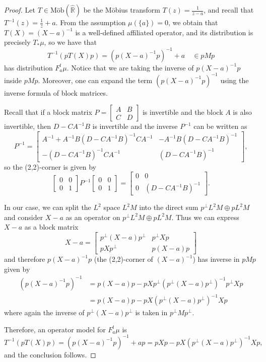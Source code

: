 \documentclass[reqno,11pt]{amsart}
\theoremstyle{remark}
\newcommand{\rr}{\mathbb{R}}
\newcommand{\pfreepower}[2]{F_{#1}^{#2}}
\newcommand{\mobr}{\text{Möb}(\hat{\rr})}
\begin{document}
\begin{proof}
Let $T\in \mobr$ be the Möbius transform $T(z)=\frac{1}{z-a}$, and recall that $T^{-1}(z)=\frac{1}{z}+a$. From the assumption $\mu(\{a\})=0$, we obtain that $T(X)=(X-a)^{-1} $ is a well-defined affiliated operator, and its distribution is precisely $T_*\mu$, so we have that
$$ T^{{-1}}( pT(X)p ) = \left( p(X-a)^{-1}p  \right)^{-1}+a \quad  \in pMp$$ 
has distribution $ \pfreepower{a}{t}\mu $. Notice that we are taking the inverse of $p(X-a)^{-1}p$ inside $ pMp$. Moreover, one can expand the term $ \left( p(X-a)^{-1}p  \right)^{-1} $ using the inverse formula of block matrices.
    
    Recall that if a block matrix $P = \begin{bmatrix}
        A&B\\
        C&D
    \end{bmatrix} $ is invertible and the block $ A $ is also invertible, then $D-CA^{-1}B$ is invertible and the inverse $P^{-1}$ can be written as
    $$ P^{-1}= \begin{bmatrix}
        A^{-1} + A^{-1}B(D-CA^{-1}B)^{-1} CA^{-1} & -A^{-1}B (D-CA^{-1}B)^{-1} \\
         -(D-CA^{-1}B)^{-1}CA^{-1}  &(D-CA^{-1}B)^{-1} 
    \end{bmatrix}, $$
so the (2,2)-corner is given by
$$\begin{bmatrix}
        0&0\\
        0&1
    \end{bmatrix} P^{-1} \begin{bmatrix}
        0&0\\
        0&1
    \end{bmatrix}= \begin{bmatrix}
        0 & 0 \\
        0 &(D-CA^{-1}B)^{-1} 
    \end{bmatrix}. $$
    
    In our case, we can split the $L^2$ space $L^2M$ into the direct sum $ p^{\perp}L^2M\oplus pL^2M $ and consider $X-a$ as an operator on $ p^{\perp}L^2M\oplus pL^2M $. Thus we can express $ X-a $ as a block matrix
    $$ X-a = \begin{bmatrix}
        p^{\perp}(X-a)p^{\perp}& p^{\perp}Xp\\
        pXp^{\perp} & p(X-a)p
    \end{bmatrix} $$
    and therefore  $p(X-a)^{-1}p $ (the (2,2)-corner of $(X-a)^{-1}$) has inverse in $pMp$ given by
    \begin{align*}
\left(p(X-a)^{-1}p \right)^{-1}&= p(X-a)p- pXp^{\perp} \left( p^{\perp}(X-a)p^{\perp}
 \right)^{-1}p^{\perp} Xp \\
 &= p(X-a)p- pX\left( p^{\perp}(X-a)p^{\perp}
 \right)^{-1}Xp
    \end{align*}
 where again the inverse of $ p^{\perp}(X-a)p^{\perp} $ is taken in $p^{\perp}Mp^{\perp} $.

Therefore, an operator model for $ \pfreepower{a}{t}\mu $ is
 $$ T^{{-1}}( pT(X)p ) = (p(X-a)^{-1}p)^{-1}+ap = pXp- pX\left( p^{\perp}(X-a)p^{\perp}\right)^{-1}Xp, $$
and the conclusion follows.
\end{proof}
\end{document}
